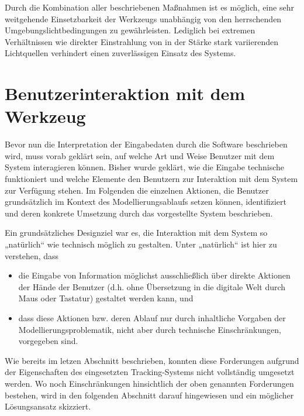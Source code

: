 Durch die Kombination aller beschriebenen Maßnahmen ist es möglich, eine sehr weitgehende Einsetzbarkeit der Werkzeugs unabhängig von den herrschenden Umgebungslichtbedingungen zu gewährleisten. Lediglich bei extremen Verhältnissen wie direkter Einstrahlung von in der Stärke stark variierenden Lichtquellen verhindert einen zuverlässigen Einsatz des Systems.  


\section{Benutzerinteraktion mit dem Werkzeug} %
\label{sec:benutzerinteraktion_mit_dem_werkzeug}

Bevor nun die Interpretation der Eingabedaten durch die Software beschrieben wird, muss vorab geklärt sein, auf welche Art und Weise Benutzer mit dem System interagieren können. Bisher wurde geklärt, wie die Eingabe technische funktioniert und welche Elemente den Benutzern zur Interaktion mit dem System zur Verfügung stehen. Im Folgenden die einzelnen Aktionen, die Benutzer grundsätzlich im Kontext des Modellierungsablaufs setzen können, identifiziert und deren konkrete Umsetzung durch das vorgestellte System beschrieben.

Ein grundsätzliches Designziel war es, die Interaktion mit dem System so „natürlich“ wie technisch möglich zu gestalten. Unter „natürlich“ ist hier zu verstehen, dass 
\begin{itemize}
	\item die Eingabe von Information möglichst ausschließlich über direkte Aktionen der Hände der Benutzer (d.h. ohne Übersetzung in die digitale Welt durch Maus oder Tastatur) gestaltet werden kann, und
	\item dass diese Aktionen bzw. deren Ablauf nur durch inhaltliche Vorgaben der Modellierungsproblematik, nicht aber durch technische Einschränkungen, vorgegeben sind.
\end{itemize}
Wie bereits im letzen Abschnitt beschrieben, konnten diese Forderungen aufgrund der Eigenschaften des eingesetzten Tracking-Systems nicht vollständig umgesetzt werden. Wo noch Einschränkungen hinsichtlich der oben genannten Forderungen bestehen, wird in den folgenden Abschnitt darauf hingewiesen und ein möglicher Lösungsansatz skizziert.

